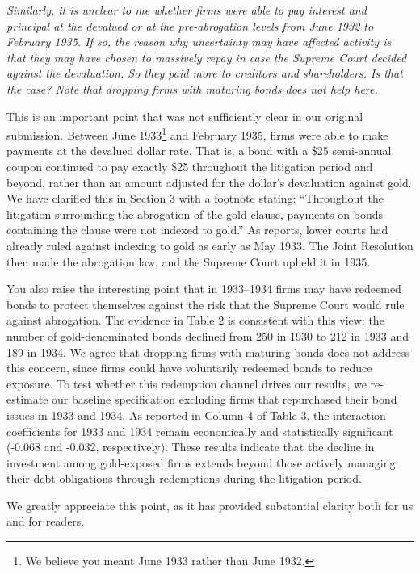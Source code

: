 \textit{\textcolor{red!60!black}{
Similarly, it is unclear to me whether firms were able to pay interest and principal at the devalued or at the pre-abrogation levels from June 1932 to February 1935. If so, the reason why uncertainty may have affected activity is that they may have chosen to massively repay in case the Supreme Court decided against the devaluation. So they paid more to creditors and shareholders. Is that the case? Note that dropping firms with maturing bonds does not help here.
}}

\bigskip

\noindent This is an important point that was not sufficiently clear in our original submission. Between June 1933\footnote{We believe you meant June 1933 rather than June 1932.} and February 1935, firms were able to make payments at the devalued dollar rate. That is, a bond with a \$25 semi-annual coupon continued to pay exactly \$25 throughout the litigation period and beyond, rather than an amount adjusted for the dollar's devaluation against gold. We have clarified this in Section 3 with a footnote stating: ``Throughout the litigation surrounding the abrogation of the gold clause, payments on bonds containing the clause were not indexed to gold.'' As \cite{Edwards2018} reports, lower courts had already ruled against indexing to gold as early as May 1933. The Joint Resolution then made the abrogation law, and the Supreme Court upheld it in 1935.

You also raise the interesting point that in 1933–1934 firms may have redeemed bonds to protect themselves against the risk that the Supreme Court would rule against abrogation. The evidence in Table 2 is consistent with this view: the number of gold-denominated bonds declined from 250 in 1930 to 212 in 1933 and 189 in 1934. We agree that dropping firms with maturing bonds does not address this concern, since firms could have voluntarily redeemed bonds to reduce exposure. To test whether this redemption channel drives our results, we re-estimate our baseline specification excluding firms that repurchased their bond issues in 1933 and 1934. As reported in Column 4 of Table 3, the interaction coefficients for 1933 and 1934 remain economically and statistically significant (-0.068 and -0.032, respectively). These results indicate that the decline in investment among gold-exposed firms extends beyond those actively managing their debt obligations through redemptions during the litigation period.

We greatly appreciate this point, as it has provided substantial clarity both for us and for readers.

